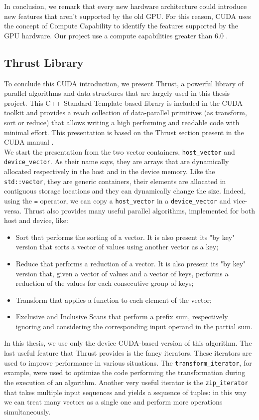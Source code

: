 In conclusion, we remark that every new hardware architecture could introduce new features that aren't supported by the old GPU. For this reason, CUDA uses the concept of Compute Capability to identify the features supported by the GPU hardware. Our project use a compute capabilities greater than 6.0 .

\subsection{Thrust Library}
To conclude this CUDA introduction, we present Thrust, a powerful library of parallel algorithms and data structures that are largely used in this thesis project. This C++ Standard Template-based library is included in the CUDA toolkit and provides a reach collection of data-parallel primitives (as transform, sort or reduce) that allows writing a high performing and readable code with minimal effort. This presentation is based on the Thrust section present in the CUDA manual \cite{cuda_manual}.\\
We start the presentation from the two vector containers, \verb|host_vector| and\\\verb|device_vector|. As their name says, they are arrays that are dynamically allocated respectively in the host and in the device memory. Like the \verb|std::vector|, they are generic containers, their elements are allocated in contiguous storage locations and they can dynamically change the size. Indeed, using the \verb|=| operator, we can copy a \verb|host_vector| in a \verb|device_vector| and vice-versa. 
Thrust also provides many useful parallel algorithms, implemented for both host and device, like:
\begin{itemize}
	\item Sort that performs the sorting of a vector. It is also present its "by key" version that sorts a vector of values using another vector as a key;
	\item Reduce that performs a reduction of a vector. It is also present its "by key" version that, given a vector of values and a vector of keys, performs a reduction of the values for each consecutive group of keys;
	\item Transform that applies a function to each element of the vector;
	\item Exclusive and Inclusive Scans that perform a prefix sum, respectively ignoring and considering the corresponding input operand in the partial sum.
\end{itemize}
In this thesis, we use only the device CUDA-based version of this algorithm.
The last useful feature that Thrust provides is the fancy iterators. These iterators are used to improve performance in various situations. The \verb|transform_iterator|, for example, were used to optimize the code performing the transformation during the execution of an algorithm. Another very useful iterator is the \verb|zip_iterator| that takes multiple input sequences and yields a sequence of tuples: in this way we can treat many vectors as a single one and perform more operations simultaneously.
